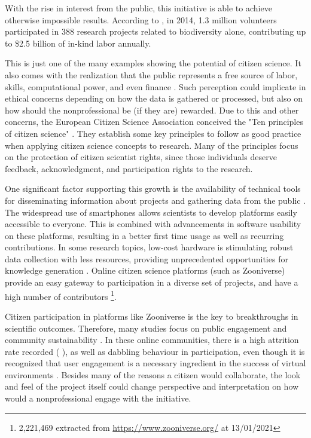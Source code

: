 With the rise in interest from the public, this initiative is able to achieve otherwise impossible results. According to \cite{theobald2015global}, in 2014, 1.3 million volunteers participated in 388 research projects related to biodiversity alone, contributing up to \$2.5 billion of in-kind labor annually.

This is just one of the many examples showing the potential of citizen science. It also comes with the realization that the public represents a free source of labor, skills, computational power, and even finance \cite{silvertown2009new}. Such perception could implicate in ethical concerns depending on how the data is gathered or processed, but also on how should the nonprofessional be (if they are) rewarded. Due to this and other concerns, the European Citizen Science Association conceived the "Ten principles of citizen science" \cite{robinson2018ten}. They establish some key principles to follow as good practice when applying citizen science concepts to research. Many of the principles focus on the protection of citizen scientist rights, since those individuals deserve feedback, acknowledgment, and participation rights to the research.

One significant factor supporting this growth is the availability of technical tools for disseminating information about projects and gathering data from the public \cite{silvertown2009new}. The widespread use of smartphones allows scientists to develop platforms easily accessible to everyone. This is combined with advancements in software usability on these platforms, resulting in a better first time usage as well as recurring contributions. In some research topics, low-cost hardware is stimulating robust data collection with less resources, providing unprecedented opportunities for knowledge generation \cite{buytaert2014citizen}. Online citizen science platforms (such as Zooniverse) provide an easy gateway to participation in a diverse set of projects, and have a high number of contributors \footnote{2,221,469 extracted from \url{https://www.zooniverse.org/} at 13/01/2021}.

Citizen participation in platforms like Zooniverse is the key to breakthroughs in scientific outcomes. Therefore, many studies focus on public engagement and community sustainability \cite{aristeidou2017profiles}. In these online communities, there is a high attrition rate recorded (\cite{nov2011technology} \cite{ponciano2015finding}), as well as dabbling behaviour \cite{eveleigh2014designing} in participation, even though it is recognized that user engagement is a necessary ingredient in the success of virtual environments \cite{verhagen2015benefitting}. Besides many of the reasons a citizen would collaborate, the look and feel of the project itself could change perspective and interpretation on how would a nonprofessional engage with the initiative.

